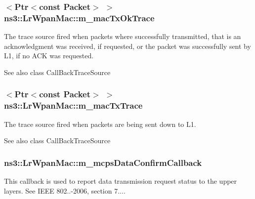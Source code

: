 \subsubsection[{\texorpdfstring{m\+\_\+mac\+Tx\+Ok\+Trace}{m_macTxOkTrace}}]{$<${\bf Ptr}$<$const {\bf Packet}$>$ $>$ ns3\+::\+Lr\+Wpan\+Mac\+::m\+\_\+mac\+Tx\+Ok\+Trace\hspace{0.3cm}{\ttfamily [private]}}\hypertarget{classns3_1_1LrWpanMac_a0f0ba6655bd6aba1bac028bd25f4ab7a}{}\label{classns3_1_1LrWpanMac_a0f0ba6655bd6aba1bac028bd25f4ab7a}
The trace source fired when packets where successfully transmitted, that is an acknowledgment was received, if requested, or the packet was successfully sent by L1, if no A\+CK was requested.

\begin{DoxySeeAlso}{See also}
class Call\+Back\+Trace\+Source 
\end{DoxySeeAlso}
\subsubsection[{\texorpdfstring{m\+\_\+mac\+Tx\+Trace}{m_macTxTrace}}]{$<${\bf Ptr}$<$const {\bf Packet}$>$ $>$ ns3\+::\+Lr\+Wpan\+Mac\+::m\+\_\+mac\+Tx\+Trace\hspace{0.3cm}{\ttfamily [private]}}\hypertarget{classns3_1_1LrWpanMac_ab92d16ed0eba3f4357b949c0685c1a96}{}\label{classns3_1_1LrWpanMac_ab92d16ed0eba3f4357b949c0685c1a96}
The trace source fired when packets are being sent down to L1.

\begin{DoxySeeAlso}{See also}
class Call\+Back\+Trace\+Source 
\end{DoxySeeAlso}
\subsubsection[{\texorpdfstring{m\+\_\+mcps\+Data\+Confirm\+Callback}{m_mcpsDataConfirmCallback}}]{ ns3\+::\+Lr\+Wpan\+Mac\+::m\+\_\+mcps\+Data\+Confirm\+Callback\hspace{0.3cm}{\ttfamily [private]}}\hypertarget{classns3_1_1LrWpanMac_a05eba7a98d1cbbf86151290069e093e0}{}\label{classns3_1_1LrWpanMac_a05eba7a98d1cbbf86151290069e093e0}
This callback is used to report data transmission request status to the upper layers. See I\+E\+EE 802..-\/2006, section 7.... 
